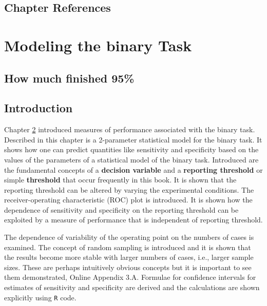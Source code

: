 \documentclass[
]{book}
\begin{document}
\hypertarget{binary-task-references}{%
\section{Chapter References}\label{binary-task-references}}

\hypertarget{binary-task-model}{%
\chapter{Modeling the binary Task}\label{binary-task-model}}

\hypertarget{binary-task-model-how-much-finished}{%
\section{How much finished 95\%}\label{binary-task-model-how-much-finished}}

\hypertarget{binary-task-model-intro}{%
\section{Introduction}\label{binary-task-model-intro}}

Chapter \ref{binary-task-model} introduced measures of performance associated with the binary task. Described in this chapter is a 2-parameter statistical model for the binary task. It shows how one can predict quantities like sensitivity and specificity based on the values of the parameters of a statistical model of the binary task. Introduced are the fundamental concepts of a \textbf{decision variable} and a \textbf{reporting threshold} or simple \textbf{threshold} that occur frequently in this book. It is shown that the reporting threshold can be altered by varying the experimental conditions. The receiver-operating characteristic (ROC) plot is introduced. It is shown how the dependence of sensitivity and specificity on the reporting threshold can be exploited by a measure of performance that is independent of reporting threshold.

The dependence of variability of the operating point on the numbers of cases is examined. The concept of random sampling is introduced and it is shown that the results become more stable with larger numbers of cases, i.e., larger sample sizes. These are perhaps intuitively obvious concepts but it is important to see them demonstrated, Online Appendix 3.A. Formulae for confidence intervals for estimates of sensitivity and specificity are derived and the calculations are shown explicitly using \texttt{R} code.
\end{document}
